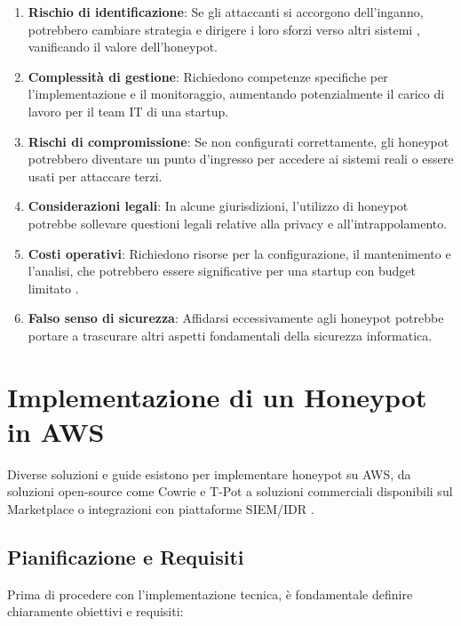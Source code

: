 \begin{enumerate}
    \item \textbf{Rischio di identificazione}: Se gli attaccanti si accorgono dell'inganno, potrebbero cambiare strategia e dirigere i loro sforzi verso altri sistemi \cite{insic2023, perego_2023}, vanificando il valore dell'honeypot.
    \item \textbf{Complessità di gestione}: Richiedono competenze specifiche per l'implementazione e il monitoraggio, aumentando potenzialmente il carico di lavoro per il team IT di una startup.
    \item \textbf{Rischi di compromissione}: Se non configurati correttamente, gli honeypot potrebbero diventare un punto d'ingresso per accedere ai sistemi reali \cite{universeit2021} o essere usati per attaccare terzi.
    \item \textbf{Considerazioni legali}: In alcune giurisdizioni, l'utilizzo di honeypot potrebbe sollevare questioni legali relative alla privacy e all'intrappolamento.
    \item \textbf{Costi operativi}: Richiedono risorse per la configurazione, il mantenimento e l'analisi, che potrebbero essere significative per una startup con budget limitato \cite{reddit_ec2}.
    \item \textbf{Falso senso di sicurezza}: Affidarsi eccessivamente agli honeypot potrebbe portare a trascurare altri aspetti fondamentali della sicurezza informatica.
\end{enumerate}

\section{Implementazione di un Honeypot in AWS}
\label{sec:implementazione_aws}

Diverse soluzioni e guide esistono per implementare honeypot su AWS, da soluzioni open-source come Cowrie \cite{cowrie_aws, infosanity_2020, cowrie_devs_2024} e T-Pot \cite{zhang_2023} a soluzioni commerciali disponibili sul Marketplace \cite{aws_marketplace} o integrazioni con piattaforme SIEM/IDR \cite{rapid7, 10183431}.

\subsection{Pianificazione e Requisiti}
\label{subsec:pianificazione}

Prima di procedere con l'implementazione tecnica, è fondamentale definire chiaramente obiettivi e requisiti:

